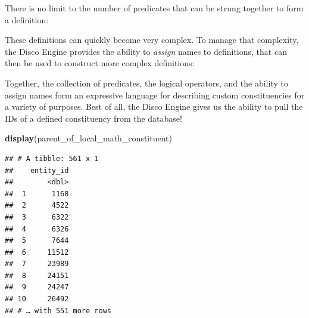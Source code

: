 \documentclass[]{book}
\newenvironment{Shaded}{\begin{snugshade}}{\end{snugshade}}
\newcommand{\KeywordTok}[1]{\textcolor[rgb]{0.13,0.29,0.53}{\textbf{#1}}}
\newcommand{\NormalTok}[1]{#1}
\newcommand{\OperatorTok}[1]{\textcolor[rgb]{0.81,0.36,0.00}{\textbf{#1}}}
\newcommand{\StringTok}[1]{\textcolor[rgb]{0.31,0.60,0.02}{#1}}
\begin{document}
There is no limit to the number of predicates that can be strung together to form a definition:

\begin{Shaded}
\end{Shaded}

These definitions can quickly become very complex. To manage that complexity, the Disco Engine provides the ability to \emph{assign} names to definitions, that can then be used to construct more complex definitions:

\begin{Shaded}
\end{Shaded}

Together, the collection of predicates, the logical operators, and the ability to assign names form an expressive language for describing custom constituencies for a variety of purposes. Best of all, the Disco Engine gives us the ability to pull the IDs of a defined constituency from the database!

\begin{Shaded}
\begin{Highlighting}[]
\KeywordTok{display}\NormalTok{(parent_of_local_math_constituent)}
\end{Highlighting}
\end{Shaded}

\begin{verbatim}
## # A tibble: 561 x 1
##    entity_id
##        <dbl>
##  1      1168
##  2      4522
##  3      6322
##  4      6326
##  5      7644
##  6     11512
##  7     23989
##  8     24151
##  9     24247
## 10     26492
## # … with 551 more rows
\end{verbatim}
\end{document}
